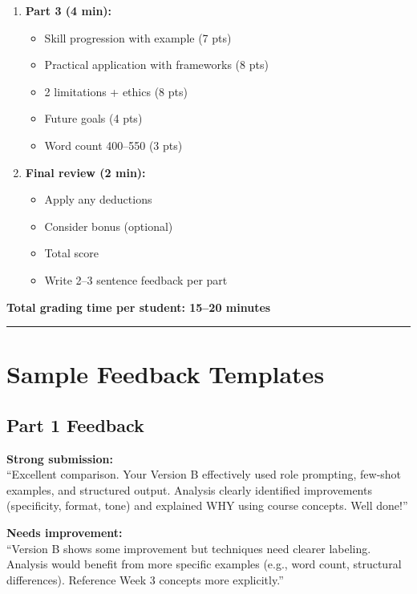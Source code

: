 \documentclass[11pt]{article}
\begin{document}
\begin{enumerate}
    \item \textbf{Part 3 (4 min):}
    \begin{itemize}
        \item[$\square$] Skill progression with example (7 pts)
        \item[$\square$] Practical application with frameworks (8 pts)
        \item[$\square$] 2 limitations + ethics (8 pts)
        \item[$\square$] Future goals (4 pts)
        \item[$\square$] Word count 400--550 (3 pts)
    \end{itemize}
    
    \item \textbf{Final review (2 min):}
    \begin{itemize}
        \item[$\square$] Apply any deductions
        \item[$\square$] Consider bonus (optional)
        \item[$\square$] Total score
        \item[$\square$] Write 2--3 sentence feedback per part
    \end{itemize}
\end{enumerate}

\textbf{Total grading time per student: 15--20 minutes}

\hrule
\vspace{0.5cm}

\section{Sample Feedback Templates}

\subsection*{Part 1 Feedback}

\textbf{Strong submission:}\\
``Excellent comparison. Your Version B effectively used role prompting, few-shot examples, and structured output. Analysis clearly identified improvements (specificity, format, tone) and explained WHY using course concepts. Well done!''

\textbf{Needs improvement:}\\
``Version B shows some improvement but techniques need clearer labeling. Analysis would benefit from more specific examples (e.g., word count, structural differences). Reference Week 3 concepts more explicitly.''
\end{document}
